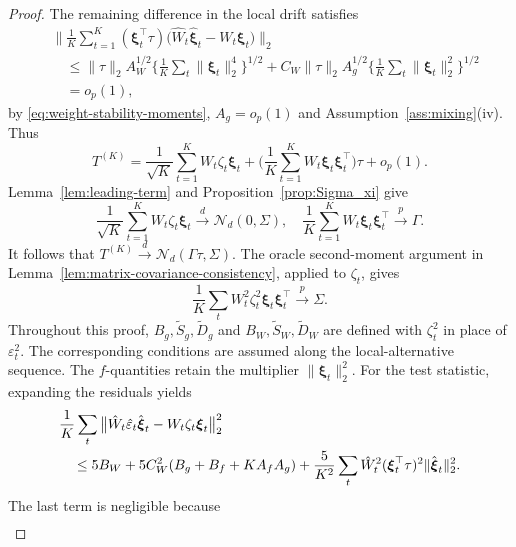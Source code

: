 \documentclass[12pt]{article}
\numberwithin{equation}{section}
\begin{document}
\begin{proof}
The remaining difference in the local drift satisfies
\begin{align*}
&\Big\|\frac1K\sum_{t=1}^K
(\boldsymbol\xi_t^\top\tau)
\big(\hat W_t\hat{\boldsymbol\xi}_t-W_t\boldsymbol\xi_t\big)\Big\|_2\\
&\quad\leq\|\tau\|_2 A_W^{1/2}
\Big\{\frac1K\sum_t\|\boldsymbol\xi_t\|_2^4\Big\}^{1/2}
+C_W\|\tau\|_2 A_g^{1/2}
\Big\{\frac1K\sum_t\|\boldsymbol\xi_t\|_2^2\Big\}^{1/2} \\
&\quad =o_p(1),
\end{align*}
by \eqref{eq:weight-stability-moments}, $A_g = o_p(1)$ and
Assumption~\ref{ass:mixing}(iv). Thus
\begin{equation}
\label{eq:local-expansion}
T^{(K)}
=\frac1{\sqrt K}\sum_{t=1}^K W_t\zeta_t\boldsymbol\xi_t
+\Big(\frac1K\sum_{t=1}^K
W_t\boldsymbol\xi_t\boldsymbol\xi_t^\top\Big)\tau+o_p(1).
\end{equation}
Lemma~\ref{lem:leading-term} and Proposition~\ref{prop:Sigma_xi} give
\begin{equation}
\label{eq:local-drift-martingale}
\frac1{\sqrt K}\sum_{t=1}^K W_t\zeta_t\boldsymbol\xi_t
\xrightarrow{d}\mathcal N_d(0,\Sigma),\quad
\frac1K\sum_{t=1}^K W_t\boldsymbol\xi_t\boldsymbol\xi_t^\top
\xrightarrow{p}\Gamma.
\end{equation}
It follows that \(T^{(K)}\xrightarrow{d}\mathcal N_d(\Gamma\tau,\Sigma)\). The oracle second-moment argument in
Lemma~\ref{lem:matrix-covariance-consistency}, applied to \(\zeta_t\), gives
\begin{equation}
\label{eq:local-oracle-second-moment}
\frac1K\sum_tW_t^2\zeta_t^2
\boldsymbol\xi_t\boldsymbol\xi_t^\top\xrightarrow{p}\Sigma.
\end{equation}
Throughout this proof, $B_g,\tilde S_g,\tilde D_g$ and
$B_W,\tilde S_W,\tilde D_W$ are defined with $\zeta_t^2$
in place of $\varepsilon_t^2$. The corresponding conditions
are assumed along the local-alternative sequence.
The $f$-quantities retain the multiplier $\|\boldsymbol\xi_t\|_2^2$. For the test statistic, expanding the residuals yields
\begin{align}
&\frac1K\sum_t\big\|
\hat W_t\hat\varepsilon_t\hat{\boldsymbol\xi}_t
-W_t\zeta_t\boldsymbol\xi_t\big\|_2^2\notag\\
&\quad\leq5B_W+5C_W^2(B_g+B_f+K A_fA_g)
+\frac5{K^2}\sum_t\hat W_t^2
(\boldsymbol\xi_t^\top\tau)^2\|\hat{\boldsymbol\xi}_t\|_2^2.
\label{eq:local-feasible-score-distance}
\end{align}
The last term is negligible because
\begin{align*}

\end{align*}
\end{proof}
\end{document}
